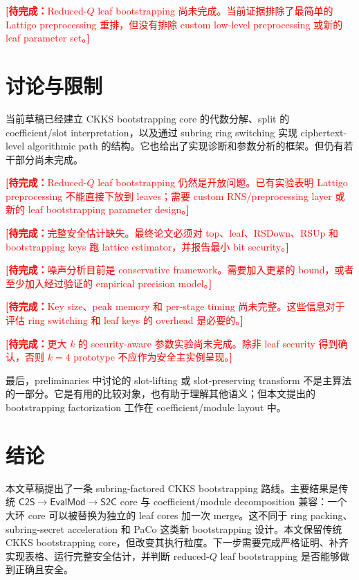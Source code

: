 \documentclass[UTF8,11pt]{article}
\newcommand{\todo}[1]{\textcolor{red}{\textbf{[待完成：}#1\textbf{]}}}
\newcommand{\CtwoS}{\mathsf{C2S}}
\newcommand{\StwoC}{\mathsf{S2C}}
\newcommand{\EvalMod}{\mathsf{EvalMod}}
\theoremstyle{definition}
\theoremstyle{plain}
\begin{document}
\todo{Reduced-$Q$ leaf bootstrapping 尚未完成。当前证据排除了最简单的 Lattigo preprocessing 重排，但没有排除 custom low-level preprocessing 或新的 leaf parameter set。}

\section{讨论与限制}

当前草稿已经建立 CKKS bootstrapping core 的代数分解、split 的 coefficient/slot interpretation，以及通过 subring ring switching 实现 ciphertext-level algorithmic path 的结构。它也给出了实现诊断和参数分析的框架。但仍有若干部分尚未完成。

\todo{Reduced-$Q$ leaf bootstrapping 仍然是开放问题。已有实验表明 Lattigo preprocessing 不能直接下放到 leaves；需要 custom RNS/preprocessing layer 或新的 leaf bootstrapping parameter design。}

\todo{完整安全估计缺失。最终论文必须对 top、leaf、RSDown、RSUp 和 bootstrapping keys 跑 lattice estimator，并报告最小 bit security。}

\todo{噪声分析目前是 conservative framework。需要加入更紧的 bound，或者至少加入经过验证的 empirical precision model。}

\todo{Key size、peak memory 和 per-stage timing 尚未完整。这些信息对于评估 ring switching 和 leaf keys 的 overhead 是必要的。}

\todo{更大 $k$ 的 security-aware 参数实验尚未完成。除非 leaf security 得到确认，否则 $k=4$ prototype 不应作为安全主实例呈现。}

最后，preliminaries 中讨论的 slot-lifting 或 slot-preserving transform 不是主算法的一部分。它是有用的比较对象，也有助于理解其他语义；但本文提出的 bootstrapping factorization 工作在 coefficient/module layout 中。

\section{结论}
本文草稿提出了一条 subring-factored CKKS bootstrapping 路线。主要结果是传统 $\CtwoS\to\EvalMod\to\StwoC$ core 与 coefficient/module decomposition 兼容：一个大环 core 可以被替换为独立的 leaf cores 加一次 merge。这不同于 ring packing、subring-secret acceleration 和 PaCo 这类新 bootstrapping 设计。本文保留传统 CKKS bootstrapping core，但改变其执行粒度。下一步需要完成严格证明、补齐实现表格、运行完整安全估计，并判断 reduced-$Q$ leaf bootstrapping 是否能够做到正确且安全。
\end{document}
